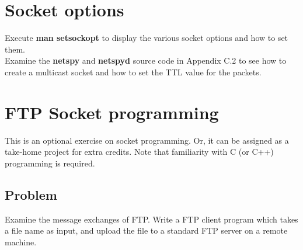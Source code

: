 \documentclass[10pt,a4paper]{article}
\numberwithin{equation}{section}
\numberwithin{figure}{section}
\numberwithin{table}{section}
\begin{document}
\section{Socket options}
    Execute \textbf{man setsockopt} to display the various socket options and how to set them.\\
    Examine the \textbf{netspy} and \textbf{netspyd} source code in Appendix C.2 to see how to create a multicast socket and how to set the TTL value for the packets.


\section{FTP Socket programming}
    This is an optional exercise on socket programming. Or, it can be assigned as a take-home project for extra credits. Note that familiarity with C (or C++) programming is required.

    \subsection*{Problem}
    Examine the message exchanges of FTP. Write a FTP client program which takes a file name as input, and upload the file to a standard FTP server on a remote machine.
\end{document}
